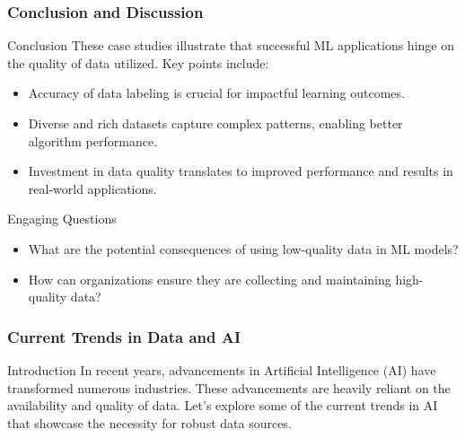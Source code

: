 \documentclass[aspectratio=169]{beamer}
\begin{document}
\begin{frame}[fragile]
    \frametitle{Conclusion and Discussion}
    \begin{block}{Conclusion}
        These case studies illustrate that successful ML applications hinge on the quality of data utilized. Key points include:
        \begin{itemize}
            \item Accuracy of data labeling is crucial for impactful learning outcomes.
            \item Diverse and rich datasets capture complex patterns, enabling better algorithm performance.
            \item Investment in data quality translates to improved performance and results in real-world applications.
        \end{itemize}
    \end{block}

    \begin{block}{Engaging Questions}
        \begin{itemize}
            \item What are the potential consequences of using low-quality data in ML models?
            \item How can organizations ensure they are collecting and maintaining high-quality data?
        \end{itemize}
    \end{block}
\end{frame}

\begin{frame}[fragile]
    \frametitle{Current Trends in Data and AI}
    \begin{block}{Introduction}
        In recent years, advancements in Artificial Intelligence (AI) have transformed numerous industries. These advancements are heavily reliant on the availability and quality of data. 
        Let's explore some of the current trends in AI that showcase the necessity for robust data sources.
    \end{block}
\end{frame}
\end{document}
